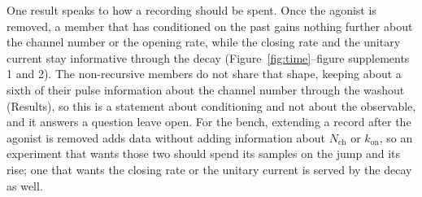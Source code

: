 One result speaks to how a recording should be spent. Once the agonist is removed, a member that has conditioned on the past gains nothing further about the channel number or the opening rate, while the closing rate and the unitary current stay informative through the decay (Figure~\ref{fig:time}--figure supplements 1 and 2). %
The non-recursive members do not share that shape, keeping about a sixth of their pulse information about the channel number through the washout (Results), so this is a statement about conditioning and not about the observable, and it answers a question \citet{delcore2025parameter} leave open. For the bench, extending a record after the agonist is removed adds data without adding information about $N_{\mathrm{ch}}$ or $k_{\mathrm{on}}$, so an experiment that wants those two should spend its samples on the jump and its rise; one that wants the closing rate or the unitary current is served by the decay as well.

